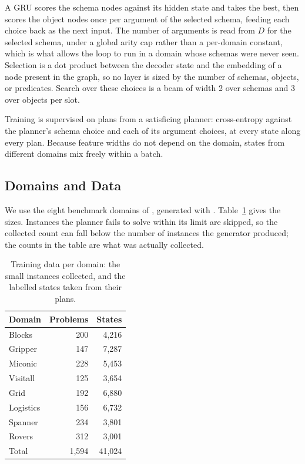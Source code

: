 \documentclass{article} %
\begin{document}
A GRU scores the schema nodes against its hidden state and takes the best,
then scores the object nodes once per argument of the selected schema,
feeding each choice back as the next input. The number of arguments is read
from $D$ for the selected schema, under a global arity cap rather than a
per-domain constant, which is what allows the loop to run in a domain whose
schemas were never seen. Selection is a dot product between the decoder state
and the embedding of a node present in the graph, so no layer is sized by the
number of schemas, objects, or predicates. Search over these choices is a
beam of width 2 over schemas and 3 over objects per slot.

Training is supervised on plans from a satisficing planner: cross-entropy
against the planner's schema choice and each of its argument choices, at
every state along every plan. Because feature widths do not depend on the
domain, states from different domains mix freely within a batch.


\subsection{Domains and Data}
\label{app:data}

We use the eight benchmark domains of \citet{gabar}, generated with
\citet{pddl-generators}. Table~\ref{tab:data} gives the sizes. Instances the
planner fails to solve within its limit are skipped, so the collected count
can fall below the number of instances the generator produced; the counts in
the table are what was actually collected.

\begin{table}[t]
\small
\centering
\caption{Training data per domain: the small instances collected, and the
labelled states taken from their plans.}
\label{tab:data}
\begin{tabular}{@{}lrr@{}}
\toprule
Domain & Problems & States \\
\midrule
Blocks     & 200 & 4{,}216 \\
Gripper    & 147 & 7{,}287 \\
Miconic    & 228 & 5{,}453 \\
Visitall   & 125 & 3{,}654 \\
Grid       & 192 & 6{,}880 \\
Logistics  & 156 & 6{,}732 \\
Spanner    & 234 & 3{,}801 \\
Rovers     & 312 & 3{,}001 \\
\midrule
Total      & 1{,}594 & 41{,}024 \\
\bottomrule
\end{tabular}
\end{table}
\end{document}
